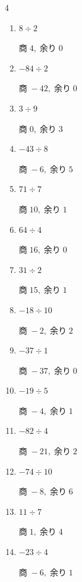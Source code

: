 \newpage
\resetdrill

\begin{multicols}{4}
\begin{enumerate}
  \itemsep=3pt
  \item $8 \div 2$

        $商\; 4,\; 余り\; 0$

  \item $-84 \div 2$

        $商\; -42,\; 余り\; 0$

  \item $3 \div 9$

        $商\; 0,\; 余り\; 3$

  \item $-43 \div 8$

        $商\; -6,\; 余り\; 5$

  \item $71 \div 7$

        $商\; 10,\; 余り\; 1$

  \item $64 \div 4$

        $商\; 16,\; 余り\; 0$

  \item $31 \div 2$

        $商\; 15,\; 余り\; 1$

  \item $-18 \div 10$

        $商\; -2,\; 余り\; 2$

  \item $-37 \div 1$

        $商\; -37,\; 余り\; 0$

  \item $-19 \div 5$

        $商\; -4,\; 余り\; 1$

  \item $-82 \div 4$

        $商\; -21,\; 余り\; 2$

  \item $-74 \div 10$

        $商\; -8,\; 余り\; 6$

  \item $11 \div 7$

        $商\; 1,\; 余り\; 4$

  \item $-23 \div 4$

        $商\; -6,\; 余り\; 1$


\end{enumerate}
\end{multicols}
